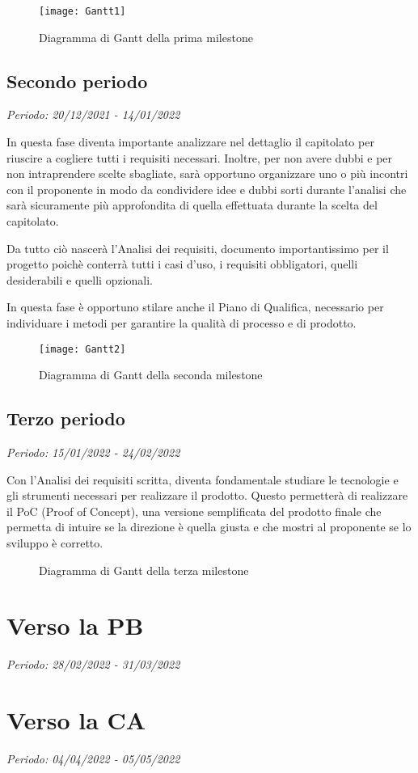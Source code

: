 \begin{figure}[!ht]
    \texttt{[image: Gantt1]}
    \caption{Diagramma di Gantt della prima milestone} 
\end{figure}

\subsection{Secondo periodo}

\textit{Periodo: 20/12/2021 - 14/01/2022}

In questa fase diventa importante analizzare nel dettaglio il capitolato per riuscire a
cogliere tutti i requisiti necessari. Inoltre, per non avere dubbi e per non intraprendere
scelte sbagliate, sarà opportuno organizzare uno o più incontri con il proponente in modo da
condividere idee e dubbi sorti durante l'analisi che sarà sicuramente più approfondita di quella
effettuata durante la scelta del capitolato.
\par Da tutto ciò nascerà l'Analisi dei requisiti, documento importantissimo per il progetto poichè
conterrà tutti i casi d'uso, i requisiti obbligatori, quelli desiderabili e quelli opzionali.
\par In questa fase è opportuno stilare anche il Piano di Qualifica, necessario per individuare
i metodi per garantire la qualità di processo e di prodotto.

\begin{figure}[!ht]
    \texttt{[image: Gantt2]}
    \caption{Diagramma di Gantt della seconda milestone} 
\end{figure}

\subsection{Terzo periodo}

\textit{Periodo: 15/01/2022 - 24/02/2022}

Con l'Analisi dei requisiti scritta, diventa fondamentale studiare le tecnologie e gli strumenti necessari
per realizzare il prodotto. Questo permetterà di realizzare il PoC (Proof of Concept), una versione semplificata 
del prodotto finale che permetta di intuire se la direzione è quella giusta e che mostri al proponente se lo 
sviluppo è corretto.

\begin{figure}[!ht]
    \caption{Diagramma di Gantt della terza milestone} 
\end{figure}

\section{Verso la PB}

\textit{Periodo: 28/02/2022 - 31/03/2022}

\section{Verso la CA}

\textit{Periodo: 04/04/2022 - 05/05/2022}